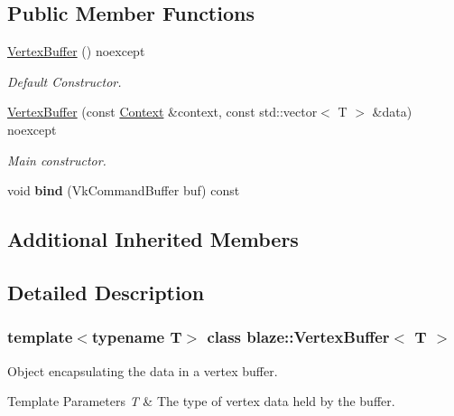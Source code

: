 \subsection*{Public Member Functions}
\begin{DoxyCompactItemize}
\item 
\mbox{\label{classblaze_1_1VertexBuffer_af1ee16f904c7f531dfd3f0cd14f9b89b}} 
\hyperlink{classblaze_1_1VertexBuffer_af1ee16f904c7f531dfd3f0cd14f9b89b}{Vertex\+Buffer} () noexcept
\begin{DoxyCompactList}\small\item\em Default Constructor. \end{DoxyCompactList}\item 
\hyperlink{classblaze_1_1VertexBuffer_a21e0c9c1fe434afb5ce5588d1ca7b0f4}{Vertex\+Buffer} (const \hyperlink{classblaze_1_1Context}{Context} \&context, const std\+::vector$<$ T $>$ \&data) noexcept
\begin{DoxyCompactList}\small\item\em Main constructor. \end{DoxyCompactList}\item 
\mbox{\label{classblaze_1_1VertexBuffer_acd64f1e4e28aefee16fb3a720d0490cd}} 
void {\bfseries bind} (Vk\+Command\+Buffer buf) const
\end{DoxyCompactItemize}
\subsection*{Additional Inherited Members}


\subsection{Detailed Description}
\subsubsection*{template$<$typename T$>$\newline
class blaze\+::\+Vertex\+Buffer$<$ T $>$}

Object encapsulating the data in a vertex buffer. 


\begin{DoxyTemplParams}{Template Parameters}
{\em T} & The type of vertex data held by the buffer. \\
\hline
\end{DoxyTemplParams}


